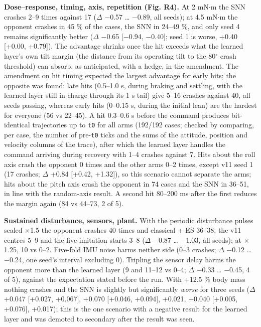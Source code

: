 \documentclass[10pt,a4paper]{article}
\begin{document}
\textbf{Dose--response, timing, axis, repetition (Fig. R4).} At 2 mN$\cdot$m the SNN crashes 2--9 times against 17 ($\Delta$ $-$0.57 \ldots{} $-$0.89, all seeds); at 4.5 mN$\cdot$m the opponent crashes in 45 \% of the cases, the SNN in 24--49 \%, and only seed 4 remains significantly better ($\Delta$ $-$0.65 [$-$0.94, $-$0.40]; seed 1 is worse, +0.40 [+0.00, +0.79]). The advantage shrinks once the hit exceeds what the learned layer's own tilt margin (the distance from its operating tilt to the 80$^\circ$ crash threshold) can absorb, as anticipated, with a hedge, in the amendment. The amendment on hit timing expected the largest advantage for early hits; the opposite was found: late hits (0.5--1.0 s, during braking and settling, with the learned layer still in charge through its 1 s tail) give 5--16 crashes against 40, all seeds passing, whereas early hits (0--0.15 s, during the initial lean) are the hardest for everyone (56 vs 22--45). A hit 0.3--0.6 s before the command produces bit-identical trajectories up to \texttt{t0} for all arms (192/192 cases; checked by comparing, per case, the number of pre-\texttt{t0} ticks and the sums of the attitude, position and velocity columns of the trace), after which the learned layer handles the command arriving during recovery with 1--4 crashes against 7. Hits about the roll axis crash the opponent 0 times and the other arms 0--2 times, except v11 seed 1 (17 crashes; $\Delta$ +0.84 [+0.42, +1.32]), so this scenario cannot separate the arms; hits about the pitch axis crash the opponent in 74 cases and the SNN in 36--51, in line with the random-axis result. A second hit 80--200 ms after the first reduces the margin again (84 vs 44--73, 2 of 5).

\textbf{Sustained disturbance, sensors, plant.} With the periodic disturbance pulses scaled $\times$1.5 the opponent crashes 40 times and classical + ES 36--38, the v11 centres 5--9 and the five imitation starts 3--8 ($\Delta$ $-$0.87 \ldots{} $-$1.03, all seeds); at $\times$1.25, 10 vs 0--2. Five-fold IMU noise harms neither side (0--3 crashes; $\Delta$ $-$0.12 \ldots{} $-$0.24, one seed's interval excluding 0). Tripling the sensor delay harms the opponent more than the learned layer (9 and 11--12 vs 0--4; $\Delta$ $-$0.33 \ldots{} $-$0.45, 4 of 5), against the expectation stated before the run. With +12.5 \% body mass nothing crashes and the SNN is slightly but significantly \emph{worse} for three seeds ($\Delta$ +0.047 [+0.027, +0.067], +0.070 [+0.046, +0.094], +0.021, +0.040 [+0.005, +0.076], +0.017); this is the one scenario with a negative result for the learned layer and was demoted to secondary after the result was seen.
\end{document}
